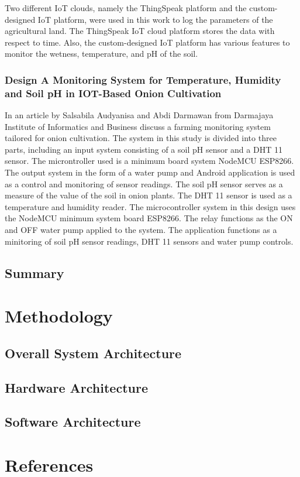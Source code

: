 \documentclass[12pt, a4paper]{article}
\begin{document}
Two different IoT clouds, namely the ThingSpeak platform and the custom-designed IoT platform, were used in this work to log the parameters of the agricultural land. The ThingSpeak IoT cloud platform stores the data with respect to time. Also, the custom-designed IoT platform has various features to monitor the wetness, temperature, and pH of the soil.

\subsubsection{Design A Monitoring System for Temperature, Humidity and Soil pH in IOT-Based Onion Cultivation}
In an article by Salsabila Audyanisa and Abdi Darmawan \cite{audyanisa2024design} from Darmajaya Institute of Informatics and Business discuss a farming monitoring system tailored for onion cultivation.
The system in this study is divided into three parts, including an input system consisting of a soil pH sensor and a DHT 11 sensor. The microntroller used is a minimum board system NodeMCU ESP8266. The output system in the form of a water pump and Android application is used as a control and monitoring of sensor readings. The soil pH sensor serves as a measure of the value of the soil in onion plants. The DHT 11 sensor is used as a temperature and humidity reader. The microcontroller system in this design uses the NodeMCU minimum system board ESP8266. The relay functions as the ON and OFF water pump applied to the system. The application functions as a minitoring of soil pH sensor readings, DHT 11 sensors and water pump controls.

\subsection{Summary}
\newpage

\section{Methodology}
\subsection{Overall System Architecture}
\subsection{Hardware Architecture}
\subsection{Software Architecture}
\newpage

\section{References}


\end{document}
